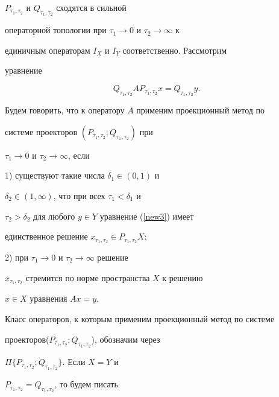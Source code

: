 $P_{\tau_1,\tau_2}$ и $Q_{\tau_1,\tau_2}$ сходятся в сильной


операторной топологии при $\tau_1\to 0$ и $\tau_2\to\infty$ к


единичным операторам $I_X$ и $I_Y$ соответственно. Рассмотрим


уравнение


\begin{equation}\label{new3}


Q_{\tau_1,\tau_2}AP_{\tau_1,\tau_2} x= Q_{\tau_1,\tau_2}y.


\end{equation}





\begin{defn}\label{dnew1}


Будем говорить, что к оператору $A$ применим проекционный метод по


системе проекторов $(P_{\tau_1,\tau_2}; Q_{\tau_1,\tau_2})$ при


$\tau_1\to 0$ и $\tau_2\to \infty$, если





1) существуют такие числа $\delta_1\in(0,1)$ и


$\delta_2\in(1,\infty)$, что при всех $\tau_1<\delta_1$ и


$\tau_2>\delta_2$ для любого $y\in Y$ уравнение (\ref{new3}) имеет


единственное решение $x_{\tau_1,\tau_2}\in P_{\tau_1,\tau_2}X$;





2) при $\tau_1\to 0$ и $\tau_2\to\infty$ решение


$x_{\tau_1,\tau_2}$ стремится по норме пространства $X$ к решению


$x\in X$ уравнения $Ax=y$.


\end{defn}





Класс операторов, к которым применим проекционный метод по системе


проекторов\linebreak ($P_{\tau_1,\tau_2};Q_{\tau_1,\tau_2}$), обозначим через


$\Pi\{P_{\tau_1,\tau_2};Q_{\tau_1,\tau_2}\}$. Если $X=Y$ и


$P_{\tau_1,\tau_2}=Q_{\tau_1,\tau_2}$, то будем писать


